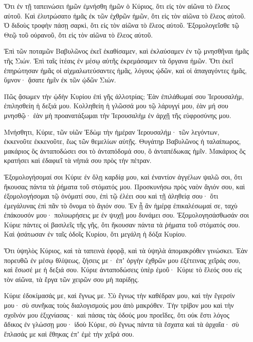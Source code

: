 \begin{spacing}{1.1}
\begin{multicols}{2}
Ὅτι ἐν τῇ ταπεινώσει ἡμῶν ἐμνήσθη ἡμῶν ὁ Κύριος, ὅτι εἰς τὸν αἰῶνα τὸ ἔλεος αὐτοῦ.
Καὶ ἐλυτρώσατο ἡμᾶς ἐκ τῶν ἐχθρῶν ἡμῶν, ὅτι εἰς τὸν αἰῶνα τὸ ἔλεος αὐτοῦ.
Ὁ διδοὺς τροφὴν πάσῃ σαρκὶ, ὅτι εἰς τὸν αἰῶνα τὸ ἔλεος αὐτοῦ.
Ἐξομολογεῖσθε τῷ Θεῷ τοῦ οὐρανοῦ, ὅτι εἰς τὸν αἰῶνα τὸ ἔλεος αὐτοῦ.

Ἐπὶ τῶν ποταμῶν Βαβυλῶνος ἐκεῖ ἐκαθίσαμεν, καὶ ἐκλαύσαμεν ἐν τῷ μνησθῆναι ἡμᾶς τῆς Σιών.
Ἐπὶ ταῖς ἰτέαις ἐν μέσῳ αὐτῆς ἐκρεμάσαμεν τὰ ὄργανα ἡμῶν.
Ὅτι ἐκεῖ ἐπηρώτησαν ἡμᾶς οἱ αἰχμαλωτεύσαντες ἡμᾶς, λόγους ᾠδῶν, καὶ οἱ ἀπαγαγόντες ἡμᾶς, ὕμνον· ᾄσατε ἡμῖν ἐκ τῶν ᾠδῶν Σιών.

Πῶς ᾄσωμεν τὴν ᾠδὴν Κυρίου ἐπὶ γῆς ἀλλοτρίας;
Ἐὰν ἐπιλάθωμαί σου Ἱερουσαλήμ, ἐπιλησθείη ἡ δεξιά μου.
Κολληθείη ἡ γλῶσσά μου τῷ λάρυγγί μου, ἐὰν μή σου μνησθῷ· ἐὰν μὴ προανατάξωμαι τὴν Ἱερουσαλὴμ ἐν ἀρχῇ τῆς εὐφροσύνης μου.

Μνήσθητι, Κύριε, τῶν υἱῶν Ἐδὼμ τὴν ἡμέραν Ἱερουσαλήμ· τῶν λεγόντων, ἐκκενοῦτε ἐκκενοῦτε, ἕως τῶν θεμελίων αὐτῇς.
Θυγάτηρ Βαβυλῶνος ἡ ταλαίπωρος, μακάριος ὃς ἀνταποδώσει σοι τὸ ἀνταπόδομά σου, ὃ ἀνταπέδωκας ἡμῖν.
Μακάριος ὃς κρατήσει καὶ ἐδαφιεῖ τὰ νήπιά σου πρὸς τὴν πέτραν.

Ἐξομολογήσομαί σοι Κύριε ἐν ὅλῃ καρδίᾳ μου, καὶ ἐναντίον ἀγγέλων ψαλῶ σοι, ὅτι ἤκουσας πάντα τὰ ῥήματα τοῦ στόματός μου.
Προσκυνήσω πρὸς ναὸν ἅγιόν σου, καὶ ἐξομολογήσομαι τῷ ὀνόματί σου, ἐπὶ τῷ ἐλέει σου καὶ τῇ ἀληθείᾳ σου· ὅτι ἐμεγάλυνας ἐπὶ πᾶν τὸ ὄνομα τὸ ἅγιόν σου.
Ἐν ᾗ ἂν ἡμέρᾳ ἐπικαλέσωμαί σε, ταχὺ ἐπάκουσόν μου· πολυωρήσεις με ἐν ψυχῇ μου δυνάμει σου.
Ἐξομολογησάσθωσάν σοι Κύριε πάντες οἱ βασιλεῖς τῆς γῆς, ὅτι ἤκουσαν πάντα τὰ ῥήματα τοῦ στόματός σου.
Καὶ ᾀσάτωσαν ἐν ταῖς ὁδοῖς Κυρίου, ὅτι μεγάλη ἡ δόξα Κυρίου.

Ὅτι ὑψηλὸς Κύριος, καὶ τὰ ταπεινὰ ἐφορᾷ, καὶ τὰ ὑψηλὰ ἀπομακρόθεν γινώσκει.
Ἐὰν πορευθῶ ἐν μέσῳ θλίψεως, ζήσεις με· ἐπʼ ὀργὴν ἐχθρῶν μου ἐξέτεινας χεῖράς σου, καὶ ἔσωσέ με ἡ δεξιά σου.
Κύριε ἀνταποδώσεις ὑπὲρ ἐμοῦ· Κύριε τὸ ἔλεός σου εἰς τὸν αἰῶνα, τὰ ἔργα τῶν χειρῶν σου μὴ παρίδῃς.

Κύριε ἐδοκίμασάς με, καὶ ἔγνως με.
Σὺ ἔγνως τὴν καθέδραν μου, καὶ τὴν ἔγερσίν μου· σὺ συνῆκας τοὺς διαλογισμούς μου ἀπὸ μακρόθεν.
Τὴν τρίβον μου καὶ τὴν σχοῖνόν μου ἑξιχνίασας· καὶ πάσας τὰς ὁδούς μου προεῖδες,
ὅτι οὐκ ἔστι λόγος ἄδικος ἐν γλώσσῃ μου· ἰδοὺ Κύριε, σὺ ἔγνως πάντα
τὰ ἔσχατα καὶ τὰ ἀρχαῖα· σὺ ἔπλασάς με καὶ ἔθηκας ἐπʼ ἐμὲ τὴν χεῖρά σου.


\end{multicols}
\end{spacing}

